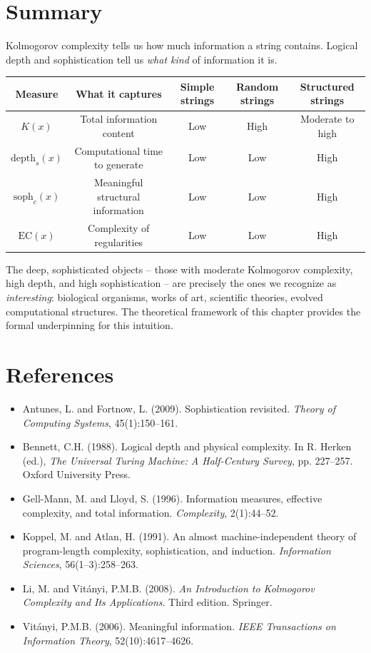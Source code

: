 \section{Summary}

Kolmogorov complexity tells us how much information a string contains. Logical depth and sophistication tell us \textit{what kind} of information it is.

\begin{center}
\begin{tabular}{ccccc}
\toprule
Measure & What it captures & Simple strings & Random strings & Structured strings \\
\midrule
$K(x)$ & Total information content & Low & High & Moderate to high \\
$\text{depth}_s(x)$ & Computational time to generate & Low & Low & High \\
$\text{soph}_c(x)$ & Meaningful structural information & Low & Low & High \\
$\text{EC}(x)$ & Complexity of regularities & Low & Low & High \\
\bottomrule
\end{tabular}
\end{center}

The deep, sophisticated objects -- those with moderate Kolmogorov complexity, high depth, and high sophistication -- are precisely the ones we recognize as \textit{interesting}: biological organisms, works of art, scientific theories, evolved computational structures. The theoretical framework of this chapter provides the formal underpinning for this intuition.

\section{References}

\begin{itemize}
\item Antunes, L. and Fortnow, L. (2009). Sophistication revisited. \textit{Theory of Computing Systems}, 45(1):150--161.
\item Bennett, C.H. (1988). Logical depth and physical complexity. In R. Herken (ed.), \textit{The Universal Turing Machine: A Half-Century Survey}, pp. 227--257. Oxford University Press.
\item Gell-Mann, M. and Lloyd, S. (1996). Information measures, effective complexity, and total information. \textit{Complexity}, 2(1):44--52.
\item Koppel, M. and Atlan, H. (1991). An almost machine-independent theory of program-length complexity, sophistication, and induction. \textit{Information Sciences}, 56(1--3):258--263.
\item Li, M. and Vitányi, P.M.B. (2008). \textit{An Introduction to Kolmogorov Complexity and Its Applications}. Third edition. Springer.
\item Vitányi, P.M.B. (2006). Meaningful information. \textit{IEEE Transactions on Information Theory}, 52(10):4617--4626.
\end{itemize}



